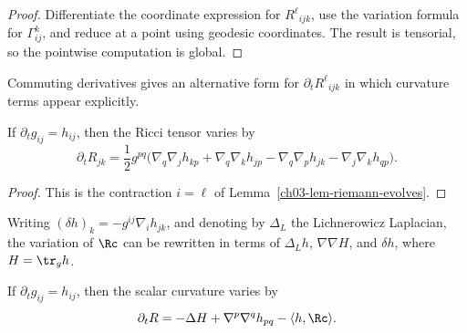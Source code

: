 \begin{proof}
\sketch Differentiate the coordinate expression for \(R^\ell{}_{ijk}\), use the variation formula for \(\Gamma^k_{ij}\), and reduce at a point using geodesic coordinates. The result is tensorial, so the pointwise computation is global.
\end{proof}

\begin{remark}
\label{ch03-rem-riemann-alt-form}

Commuting derivatives gives an alternative form for \(\partial_t R^\ell{}_{ijk}\) in which curvature terms appear explicitly.
\end{remark}

\begin{lemma}
\label{ch03-lem-ricci-evolves}

If \(\partial_t g_{ij}=h_{ij}\), then the Ricci tensor varies by
\[
\partial_t R_{jk}
=\frac12 g^{pq}\bigl(\nabla_q\nabla_j h_{kp}
+\nabla_q\nabla_k h_{jp}
-\nabla_q\nabla_p h_{jk}
-\nabla_j\nabla_k h_{qp}\bigr).
\]
\end{lemma}

\begin{proof}
\sketch This is the contraction \(i=\ell\) of Lemma~\ref{ch03-lem-riemann-evolves}.
\end{proof}

\begin{remark}
\label{ch03-rem-lichnerowicz-laplacian}

Writing \((\delta h)_k=-g^{ij}\nabla_i h_{jk}\), and denoting by \(\Delta_L\) the Lichnerowicz Laplacian, the variation of \(\Rc\) can be rewritten in terms of \(\Delta_L h\), \(\nabla\nabla H\), and \(\delta h\), where \(H=\tr_g h\).
\end{remark}

\begin{lemma}
\label{ch03-lem-scalar-curvature-evolves}

If \(\partial_t g_{ij}=h_{ij}\), then the scalar curvature varies by
\[
\partial_t R
=-\Delta H+\nabla^p\nabla^q h_{pq}-\langle h,\Rc\rangle.
\]
\end{lemma}

